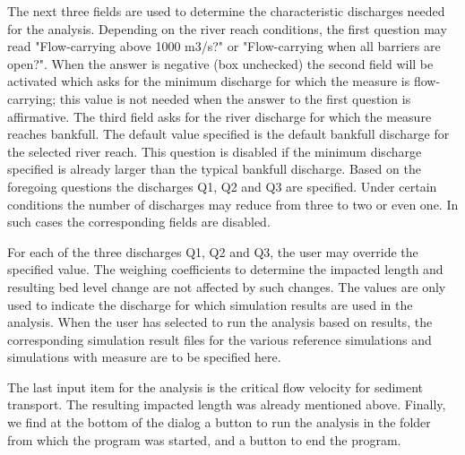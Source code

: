 The next three fields are used to determine the characteristic discharges needed for the analysis.
Depending on the river reach conditions, the first question may read "Flow-carrying above 1000 m3/s?" or "Flow-carrying when all barriers are open?".
When the answer is negative (box unchecked) the second field will be activated which asks for the minimum discharge  for which the measure is flow-carrying; this value is not needed when the answer to the first question is affirmative.
The third field asks for the river discharge  for which the measure reaches bankfull.
The default value specified is the default bankfull discharge for the selected river reach.
This question is disabled if the minimum discharge specified is already larger than the typical bankfull discharge.
Based on the foregoing questions the discharges Q1, Q2 and Q3 are specified.
Under certain conditions the number of discharges may reduce from three to two or even one.
In such cases the corresponding fields are disabled.

For each of the three discharges Q1, Q2 and Q3, the user may override the specified value.
The weighing coefficients to determine the impacted length and resulting bed level change are not affected by such changes.
The values are only used to indicate the discharge for which simulation results are used in the analysis.
When the user has selected to run the analysis based on \dflowfm results, the corresponding simulation result files for the various reference simulations and simulations with measure are to be specified here.

The last input item for the analysis is the critical flow velocity  for sediment transport.
The resulting impacted length  was already mentioned above.
Finally, we find at the bottom of the dialog a button to run the analysis in the folder from which the program was started, and a button to end the program.